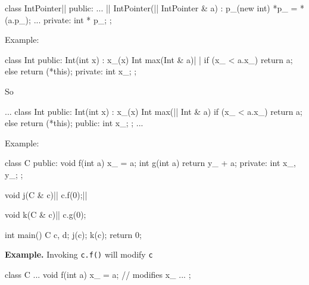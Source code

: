 \begin{consolethree}[escapeinside=||]
class IntPointer||
{
public:
    ...         ||
    IntPointer(|| IntPointer & a)
        : p_(new int)
    { *p_ = *(a.p_); }
    ...
private:
    int * p_;
};
\end{consolethree}

Example:

\begin{consolethree}[escapeinside=||]
class Int
{
public:
    Int(int x)
        : x_(x)
    {}
    Int max(Int & a)| |
    {
        if (x_ < a.x_)
            return a;
        else
            return (*this);
    }
private:
    int x_;
};
\end{consolethree}
So

\begin{consolethree}[escapeinside=||]
...
class Int
{
public:
    Int(int x)
        : x_(x)
    {}
    Int max(|| Int & a)
    {
        if (x_ < a.x_)
            return a;
        else
            return (*this);
    }
public:
    int x_;
};
...
\end{consolethree}

Example:

\begin{consolethree}[escapeinside=||]
class C
{
public:
    void f(int a)
    {
        x_ = a;
    }
    int g(int a)
    {
        return y_ + a;
    }
private:
    int x_, y_;
};

void j(C & c)||
{
    c.f(0);||
}

void k(C & c)||
{
    c.g(0);
}

int main()
{
    C c, d;
    j(c);
    k(c);
    return 0;
}
\end{consolethree}

\textbf{Example.} Invoking \texttt{c.f()} will modify \texttt{c}

\begin{consolethree}[escapeinside=||]
class C
{
    ...
    void f(int a){ x_ = a; } // modifies x_
    ...
};
\end{consolethree}

